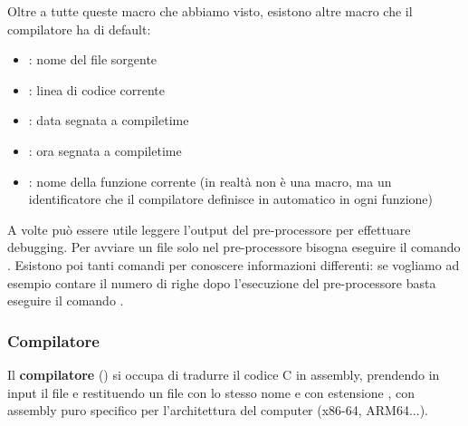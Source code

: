 \documentclass[11pt, a4paper, titlepage, oneside]{scrbook}
\begin{document}
Oltre a tutte queste macro che abbiamo visto, esistono altre macro che il compilatore ha di default: 
\begin{itemize}
    \item {}: nome del file sorgente
    \item {}: linea di codice corrente
    \item {}: data segnata a compiletime
    \item {}: ora segnata a compiletime
    \item {}: nome della funzione corrente (in realtà non è una macro, ma un identificatore che il compilatore definisce in automatico in ogni funzione)
\end{itemize}

A volte può essere utile leggere l'output del pre-processore per effettuare debugging. Per avviare un file  solo nel pre-processore bisogna eseguire il comando . Esistono poi tanti comandi per conoscere informazioni differenti: se vogliamo ad esempio contare il numero di righe dopo l'esecuzione del pre-processore basta eseguire il comando .

\subsubsection*{Compilatore}

\begin{Definizione}[Compilatore]
\label{def-compilatore}
Il \textbf{compilatore} () si occupa di tradurre il codice C in assembly, prendendo in input il file  e restituendo un file con lo stesso nome e con estensione , con assembly puro specifico per l'architettura del computer (x86-64, ARM64...).
\end{Definizione}
\end{document}
